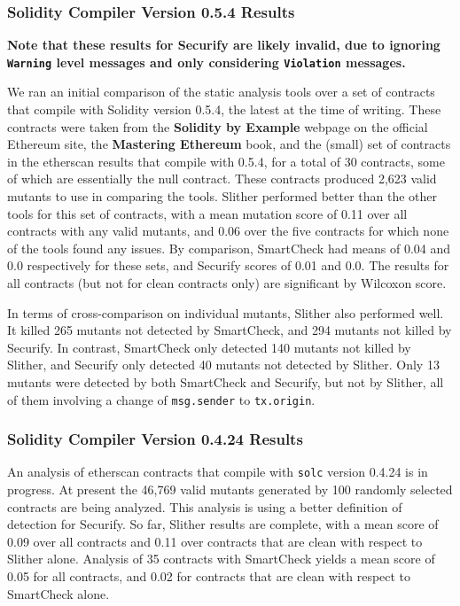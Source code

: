\documentclass{article}
\begin{document}
\subsubsection{Solidity Compiler Version 0.5.4 Results}

{\bf Note that these results for Securify are likely invalid, due to ignoring {\tt Warning} level messages and only considering {\tt Violation} messages.}

We ran an initial comparison of the static analysis tools over a set of contracts that compile with Solidity version 0.5.4, the latest at the time of writing.  These contracts were taken from the {\bf Solidity by Example} webpage on the official Ethereum site, the {\bf Mastering Ethereum} book, and the (small) set of contracts in the etherscan results that compile with 0.5.4, for a total of 30 contracts, some of which are essentially the null contract.  These contracts produced 2,623 valid mutants to use in comparing the tools.  Slither performed better than the other tools for this set of contracts, with a mean mutation score of 0.11 over all contracts with any valid mutants, and 0.06 over the five contracts for which none of the tools found any issues.  By comparison, SmartCheck had means of 0.04 and 0.0 respectively for these sets, and Securify scores of 0.01 and 0.0.  The results for all contracts (but not for clean contracts only) are significant by Wilcoxon score.

In terms of cross-comparison on individual mutants, Slither also performed well.  It killed 265 mutants not detected by SmartCheck, and 294 mutants not killed by Securify.  In contrast, SmartCheck only detected 140 mutants not killed by Slither, and Securify only detected 40 mutants not detected by Slither.  Only 13 mutants were detected by both SmartCheck and Securify, but not by Slither, all of them involving a change of {\tt msg.sender} to {\tt tx.origin}.

\subsubsection{Solidity Compiler Version 0.4.24 Results}

An analysis of etherscan contracts that compile with {\tt solc} version 0.4.24 is in progress.  At present the 46,769 valid mutants generated by 100 randomly selected contracts are being analyzed.  This analysis is using a better definition of detection for Securify.  So far, Slither results are complete, with a mean score of 0.09 over all contracts and 0.11 over contracts that are clean with respect to Slither alone.  Analysis of 35 contracts with SmartCheck yields a mean score of 0.05 for all contracts, and 0.02 for contracts that are clean with respect to SmartCheck alone.
\end{document}
